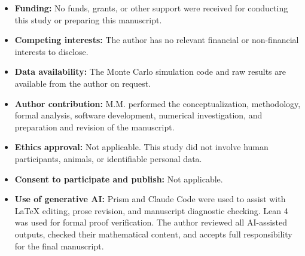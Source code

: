 \documentclass[pdflatex]{sn-jnl}
\theoremstyle{thmstyleone}
\theoremstyle{thmstyletwo}
\theoremstyle{thmstylethree}
\begin{document}
\begin{itemize}
\item \textbf{Funding:} No funds, grants, or other support were received for conducting this study or preparing this manuscript.
\item \textbf{Competing interests:} The author has no relevant financial or non-financial interests to disclose.
\item \textbf{Data availability:} The Monte Carlo simulation code and raw results are available from the author on request.
\item \textbf{Author contribution:} M.M. performed the conceptualization, methodology, formal analysis, software development, numerical investigation, and preparation and revision of the manuscript.
\item \textbf{Ethics approval:} Not applicable. This study did not involve human participants, animals, or identifiable personal data.
\item \textbf{Consent to participate and publish:} Not applicable.
\item \textbf{Use of generative AI:} Prism and Claude Code were used to assist with LaTeX editing, prose revision, and manuscript diagnostic checking. Lean 4 was used for formal proof verification. The author reviewed all AI-assisted outputs, checked their mathematical content, and accepts full responsibility for the final manuscript.
\end{itemize}
\end{document}
